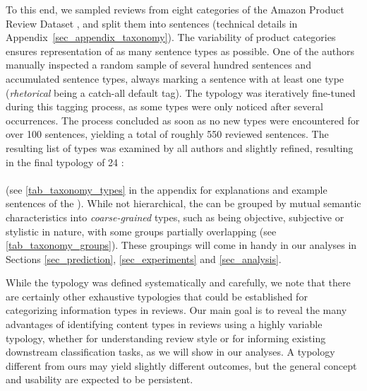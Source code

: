 To this end, we sampled reviews from eight categories of the Amazon Product Review Dataset \citep{he2016reviewsDS}, and split them into sentences (technical details in Appendix~\ref{sec_appendix_taxonomy}).
The variability of product categories ensures representation of as many sentence types as possible.
One of the authors manually inspected a random sample of several hundred sentences and accumulated sentence types, always marking a sentence with at least one type (\textit{rhetorical} being a catch-all default tag).
The typology was iteratively fine-tuned during this tagging process, as some types were only noticed after several occurrences.
The process concluded as soon as no new types were encountered for over 100 sentences, yielding a total of roughly 550 reviewed sentences.
The resulting list of types was examined by all authors and slightly refined, resulting in the final typology of 24 \taxtypes{}: \vspace{4pt} \\ \noindent{} \vspace{0.5pt} \\ (see \autoref{tab_taxonomy_types} in the appendix for explanations and example sentences of the \taxtypes{}).
While not hierarchical, the \taxtypes{} can be grouped by mutual semantic characteristics into \textit{coarse-grained} types, such as being objective, subjective or stylistic in nature, with some groups partially overlapping (see \autoref{tab_taxonomy_groups}).
These groupings will come in handy in our analyses in Sections \ref{sec_prediction}, \ref{sec_experiments} and \ref{sec_analysis}.




While the typology was defined systematically and carefully, we note that there are certainly other exhaustive typologies that could be established for categorizing information types in reviews.
Our main goal is to reveal the many advantages of identifying content types in reviews using a highly variable typology, whether for understanding review style or for informing existing downstream classification tasks, as we will show in our analyses. A typology different from ours may yield slightly different outcomes, but the general concept and usability are expected to be persistent.

